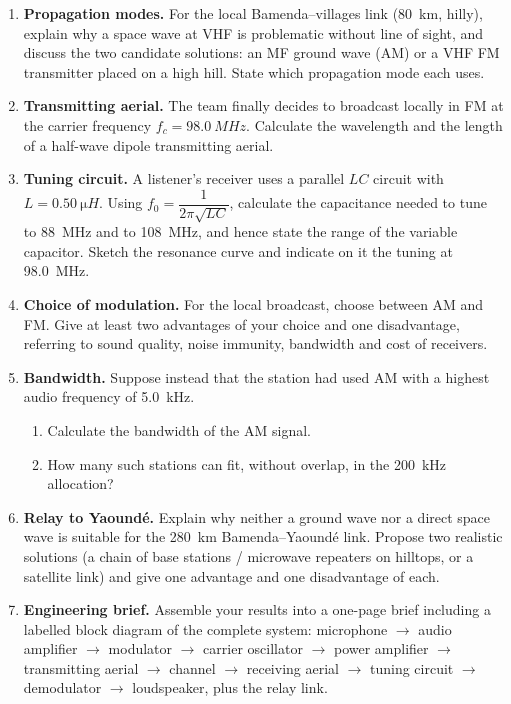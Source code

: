 \documentclass[11pt]{article}
\begin{document}
\begin{enumerate}
\item \textbf{Propagation modes.} For the local Bamenda--villages link (\SI{80}{km}, hilly), explain why a space wave at VHF is problematic without line of sight, and discuss the two candidate solutions: an MF ground wave (AM) or a VHF FM transmitter placed on a high hill. State which propagation mode each uses.
\item \textbf{Transmitting aerial.} The team finally decides to broadcast locally in FM at the carrier frequency $f_c = \SI{98.0}{MHz}$. Calculate the wavelength and the length of a half-wave dipole transmitting aerial.
\item \textbf{Tuning circuit.} A listener's receiver uses a parallel $LC$ circuit with $L = \SI{0.50}{\micro H}$. Using $f_0 = \dfrac{1}{2\pi\sqrt{LC}}$, calculate the capacitance needed to tune to \SI{88}{MHz} and to \SI{108}{MHz}, and hence state the range of the variable capacitor. Sketch the resonance curve and indicate on it the tuning at \SI{98.0}{MHz}.
\item \textbf{Choice of modulation.} For the local broadcast, choose between AM and FM. Give at least two advantages of your choice and one disadvantage, referring to sound quality, noise immunity, bandwidth and cost of receivers.
\item \textbf{Bandwidth.} Suppose instead that the station had used AM with a highest audio frequency of \SI{5.0}{kHz}. 
\begin{enumerate}
\item Calculate the bandwidth of the AM signal.
\item How many such stations can fit, without overlap, in the \SI{200}{kHz} allocation?
\end{enumerate}
\item \textbf{Relay to Yaoundé.} Explain why neither a ground wave nor a direct space wave is suitable for the \SI{280}{km} Bamenda--Yaoundé link. Propose two realistic solutions (a chain of base stations / microwave repeaters on hilltops, or a satellite link) and give one advantage and one disadvantage of each.
\item \textbf{Engineering brief.} Assemble your results into a one-page brief including a labelled block diagram of the complete system: microphone $\rightarrow$ audio amplifier $\rightarrow$ modulator $\rightarrow$ carrier oscillator $\rightarrow$ power amplifier $\rightarrow$ transmitting aerial $\rightarrow$ channel $\rightarrow$ receiving aerial $\rightarrow$ tuning circuit $\rightarrow$ demodulator $\rightarrow$ loudspeaker, plus the relay link.
\end{enumerate}
\end{document}
